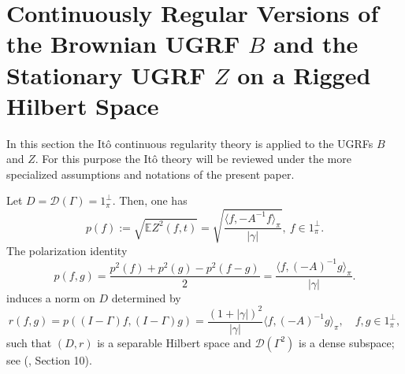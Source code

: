 \documentclass[11pt]{article}
\numberwithin{equation}{section}
\theoremstyle{definition}
\theoremstyle{remark}
\theoremstyle{definition}
\begin{document}
\section{Continuously Regular Versions of  the Brownian UGRF $B$ and the Stationary UGRF $Z$ on a Rigged
Hilbert Space}
\label{contregsec}
In this section the It\^o continuous regularity theory is applied to the 
UGRFs $B$ and $Z$. For this purpose the It\^o theory
\cite{ito} will be reviewed under the more
specialized assumptions and notations  of the present paper. 

Let $D = \mathcal{D}(\Gamma)=1_\pi^\perp$. 
Then, one has
\begin{equation}
p(f)  :=\sqrt{\mathbb{E}Z^2(f,t)}= \sqrt{\frac{\langle f,-A^{-1}f\rangle_\pi}{|\gamma|}},\  f\in1_\pi^\perp.
\end{equation}
The polarization identity
\begin{equation}\label{pfgform}
p(f,g) = \frac{p^2(f)+p^2(g) - p^2(f-g)}{2}
= \frac{\langle f,(-A)^{-1}g\rangle_\pi}{|\gamma|}.
\end{equation}
induces a norm
on $D$ determined by 
\begin{equation}
r(f,g) = p((I-\Gamma)f,(I-\Gamma)g) 
= \frac{(1+|\gamma|)^2}{|\gamma|}\langle f,(-A)^{-1}g\rangle_\pi, \quad f,g\in 1^\perp_\pi, 
\end{equation}
such that $(D,r)$ is a separable Hilbert space and
$\mathcal{D}(\Gamma^2)$ is a dense subspace; 
see (\cite{ito}, Section 10).
\end{document}
